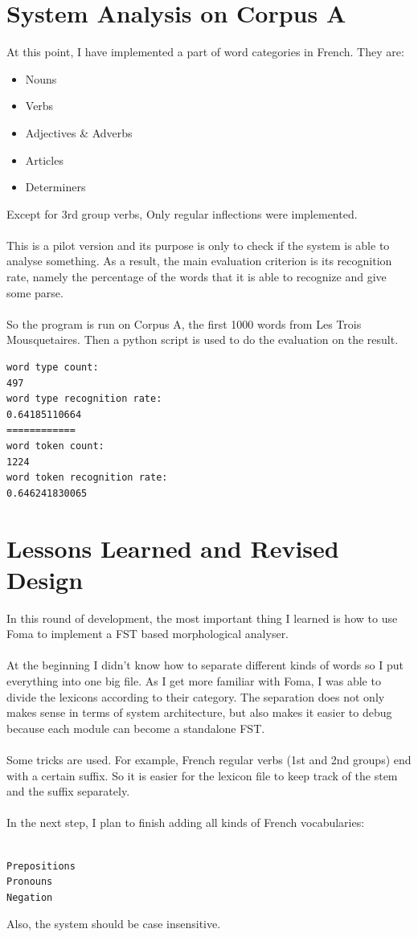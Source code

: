 \documentclass[11pt,letterpaper]{article}
\begin{document}
\section{System Analysis on Corpus A}
At this point, I have implemented a part of word categories in French. They are:\\
\begin{itemize}
\item Nouns
\item Verbs
\item Adjectives \&  Adverbs
\item Articles
\item Determiners

\end{itemize}
Except for 3rd group verbs, Only regular inflections were implemented.\\
\\
This is a pilot version and its purpose is only to check if the system is able to analyse something. As a result, the main evaluation criterion is its recognition rate, namely the percentage of the words that it is able to recognize and give some parse.\\
\\
So the program is run on Corpus A, the first 1000 words from Les Trois Mousquetaires. Then a python script is used to do the evaluation on the result.
\\
\begin{verbatim}
word type count:
497
word type recognition rate:
0.64185110664
============
word token count:
1224
word token recognition rate:
0.646241830065
\end{verbatim}

\section{Lessons Learned and Revised Design}
In this round of development, the most important thing I learned is how to use Foma to implement a FST based morphological analyser. \\
\\
At the beginning I didn't know how to separate different kinds of words so I put everything into one big file. As I get more familiar with Foma, I was able to divide the lexicons according to their category. The separation does not only makes sense in terms of system architecture, but also makes it easier to debug because each module can become a standalone FST.\\
\\
Some tricks are used. For example, French regular verbs (1st and 2nd groups) end with a certain suffix. So it is easier for the lexicon file to keep track of the stem and the suffix separately.\\
\\
In the next step, I plan to finish adding all kinds of French vocabularies:\\
\\
\begin{verbatim}
Prepositions
Pronouns
Negation
\end{verbatim}
Also, the system should be case insensitive.\\
\end{document}
